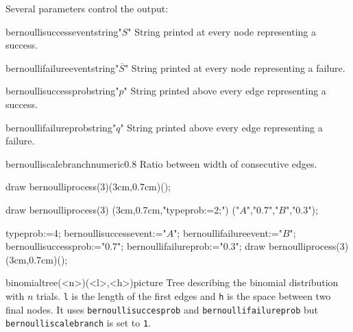 \documentclass[11pt,a4paper,english]{article}
\begin{document}
Several parameters control the output:

\begin{mptparam}{bernoullisuccessevent}{string}{"$S$"}
String printed at every node representing a success.
\end{mptparam}

\begin{mptparam}{bernoullifailureevent}{string}{"$\overline{S}$"}
String printed at every node representing a failure.
\end{mptparam}

\begin{mptparam}{bernoullisuccessprob}{string}{"$p$"}
String printed above every edge representing a success.
\end{mptparam}

\begin{mptparam}{bernoullifailureprob}{string}{"$q$"}
String printed above every edge representing a failure.
\end{mptparam}

\begin{mptparam}{bernoulliscalebranch}{numeric}{0.8}
Ratio between width of consecutive edges.
\end{mptparam}





\begin{exemple}[lefthand ratio=0.45]
draw bernoulliprocess(3)(3cm,0.7cm)();
\end{exemple}


\begin{exemple}[lefthand ratio=0.45]
draw bernoulliprocess(3)
         (3cm,0.7cm,"typeprob:=2;")
         ("$A$","$0.7$","$B$","$0.3$");
\end{exemple}

\begin{exemple}[lefthand ratio=0.45]
typeprob:=4;
bernoullisuccessevent:="$A$";
bernoullifailureevent:="$B$";
bernoullisuccessprob:="$0.7$";
bernoullifailureprob:="$0.3$";
draw bernoulliprocess(3)(3cm,0.7cm)();
\end{exemple}


\begin{rpobjet}{binomialtree(<n>)(<l>,<h>)}{picture}
Tree describing the binomial distribution with $n$ trials. \verb|l| is the length of the first edges and \verb|h| is the space between two final nodes. It uses \verb|bernoullisuccesprob| and \verb|bernoullifailureprob| but \verb|bernoulliscalebranch| is set to \verb|1|.
\end{rpobjet}
\end{document}
